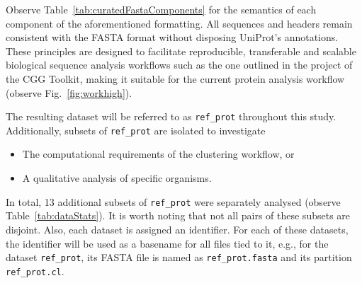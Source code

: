 Observe Table~\ref{tab:curatedFastaComponents} for the semantics of each
component of the aforementioned formatting. All sequences and headers remain
consistent with the FASTA format without disposing UniProt's annotations. These
principles are designed to facilitate reproducible, transferable and scalable
biological sequence analysis workflows such as the one outlined in the project
of the CGG Toolkit, making it suitable for the current protein analysis
workflow (observe Fig.~\ref{fig:workhigh}).

The resulting dataset will be referred to as \texttt{ref\_prot} throughout this study. Additionally, subsets of \texttt{ref\_prot} are isolated to investigate
\begin{itemize}
  \item The computational requirements of the clustering workflow, or
  \item A qualitative analysis of specific organisms.
\end{itemize}
In total, 13 additional subsets of \texttt{ref\_prot} were separately
analysed (observe Table~\ref{tab:dataStats}). It is worth noting that not all
pairs of these subsets are disjoint. Also, each dataset is assigned an
identifier. For each of these datasets, the identifier will be used as a
basename for all files tied to it, e.g., for the dataset
\texttt{ref\_prot}, its FASTA file is named as
\texttt{ref\_prot.fasta} and its partition \texttt{ref\_prot.cl}.

